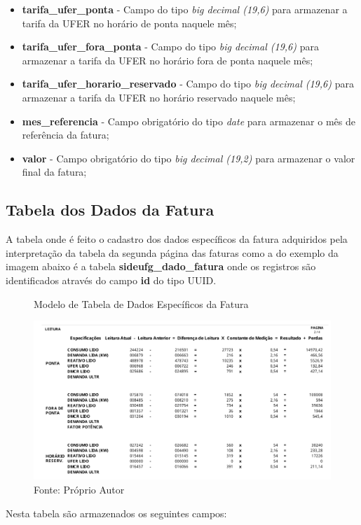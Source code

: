 \begin{itemize}
    \item \textbf{tarifa\_ufer\_ponta} - Campo do tipo \textit{big decimal (19,6)} para armazenar a tarifa da UFER no horário de ponta naquele mês;
    \item \textbf{tarifa\_ufer\_fora\_ponta} - Campo do tipo \textit{big decimal (19,6)} para armazenar a tarifa da UFER no horário fora de ponta naquele mês;
    \item \textbf{tarifa\_ufer\_horario\_reservado} - Campo do tipo \textit{big decimal (19,6)} para armazenar a tarifa da UFER no horário reservado naquele mês;
    \item \textbf{mes\_referencia} - Campo obrigatório do tipo \textit{date} para armazenar o mês de referência da fatura;
    \item \textbf{valor} - Campo obrigatório do tipo \textit{big decimal (19,2)} para armazenar o valor final da fatura;
\end{itemize}

\subsection{Tabela dos Dados da Fatura}
\label{sub:tabela-dado-fatura}
A tabela onde é feito o cadastro dos dados específicos da fatura adquiridos pela interpretação da tabela da segunda página das faturas como a do exemplo da imagem abaixo é a tabela  \textbf{sideufg\_dado\_fatura} onde os registros são identificados através do campo \textbf{id} do tipo UUID.

\begin{figure}[H]
    \centering
    \caption{Modelo de Tabela de Dados Específicos da Fatura}
\includegraphics[width=0.8\linewidth]{imagens/modelo-tabela-dados-fatura.png}
    \caption*{Fonte: Próprio Autor}
    \label{fig:modelo-tabela-dados-fatura}
\end{figure}

Nesta tabela são armazenados os seguintes campos:

